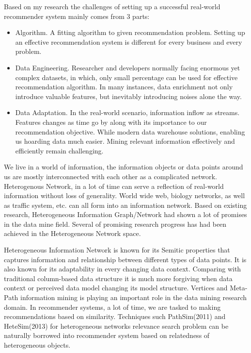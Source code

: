 \documentclass[12pt,a4 paper,title page]{article}
\begin{document}
Based on my research the challenges of setting up a successful real-world recommender system mainly comes from 3 parts:  
\begin{itemize}
\item Algorithm. A fitting algorithm to given recommendation problem. Setting up an effective recommendation system is different for every business and every problem. 

\item Data Engineering. Researcher and developers normally facing enormous yet complex datasets, in which, only small percentage can be used for effective recommendation algorithm. In many instances, data enrichment not only introduce valuable features, but inevitably introducing noises alone the way.  

\item Data Adaptation. In the real-world scenario, information inflow as streams. Features changes as time go by along with its importance to our recommendation objective. While modern data warehouse solutions, enabling us hoarding data much easier. Mining relevant information effectively and efficiently remain challenging. 
\end{itemize}
We live in a world of information, the information objects or data points around us are mostly interconnected with each other as a complicated network. Heterogenous Network, in a lot of time can serve a reflection of real-world information without loss of generality. World wide web, biology networks, as well as traffic system, etc. can all form into an information network. Based on existing research, Heterogeneous Information Graph/Network had shown a lot of promises in the data mine field. Several of promising research progress has had been achieved in the Heterogeneous Network space. 

Heterogeneous Information Network is known for its Semitic properties that captures information and relationship between different types of data points. It is also known for its adaptability in every changing data context. Comparing with traditional column-based data structure it is much more forgiving when data context or perceived data model changing its model structure. Vertices and Meta-Path information mining is playing an important role in the data mining research domain. In recommender systems, a lot of time, we are tasked to making recommendations based on similarity. Techniques such PathSim(2011) and HeteSim(2013) for heterogeneous networks relevance search problem can be naturally borrowed into recommender system based on relatedness of heterogeneous objects. 
\end{document}
